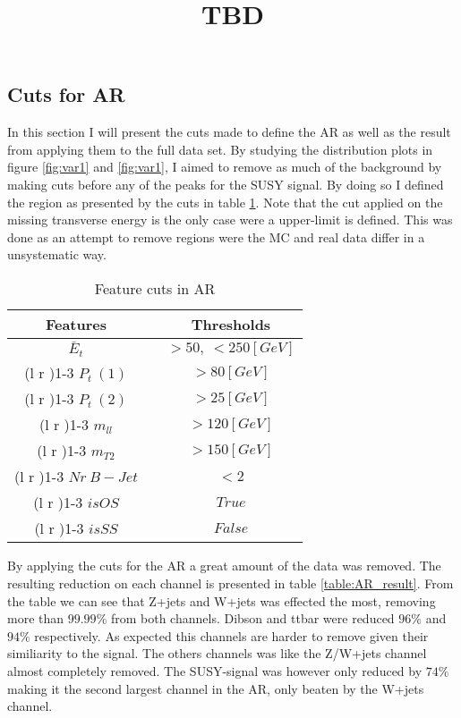 \documentclass{article}
\begin{document}
\subsection{Cuts for AR}
In this section I will present the cuts made to define the AR as well as the result from applying them to the full data set. By studying the distribution plots in figure \ref{fig:var1} and \ref{fig:var1}, I aimed to remove as much of the background by making cuts before any of the peaks for the SUSY signal. By doing so I defined the region as presented by the cuts in table \ref{table:AR}. Note that the cut applied on the missing transverse energy is the only case were a upper-limit is defined. This was done as an attempt to remove regions were the MC and real data differ in a unsystematic way.
\bgroup
\title{TBD}
{\tabcolsep=20pt
\begin{table}
    \caption{Feature cuts in AR}
    \label{table:AR}
    \centering 
    \begin{threeparttable}
    \begin{tabular}{ccc}
    Features & & Thresholds\\
     \midrule\midrule
    $\bar{E}_t$   & &  $> 50, \ < 250[GeV]$  \\%
    \cmidrule(l  r ){1-3}
     $P_t \ (1)$ & &  $> 80[GeV]$  \\ 
    \cmidrule(l r ){1-3}
     $P_t \ (2)$ & & $>25[GeV]$  \\ 
    \cmidrule(l r ){1-3}
    $m_{ll}$ & & $>120[GeV]$  \\
    \cmidrule(l r ){1-3}
    $m_{T2}$  & & $>150[GeV]$ \\
    \cmidrule(l r ){1-3}
    $Nr\ B-Jet$ & & $<2$  \\ 
    \cmidrule(l r ){1-3}
    $isOS$ & & $True$  \\ 
    \cmidrule(l r ){1-3}
    $isSS$ & & $False$  \\ 
    \midrule\midrule
    \end{tabular}
    \end{threeparttable}
\end{table}
}
\egroup
\newline
By applying the cuts for the AR a great amount of the data was removed. The resulting reduction on each channel is presented in table \ref{table:AR_result}. From the table we can see that Z+jets and W+jets was effected the most, removing more than $99.99\%$ from both channels. Dibson and ttbar were reduced $96\%$ and $94\%$ respectively. As expected this channels are harder to remove given their similiarity to the signal. The others channels was like the Z/W+jets channel almost completely removed. The SUSY-signal was however only reduced by $74\%$ making it the second largest channel in the AR, only beaten by the W+jets channel.
\end{document}

